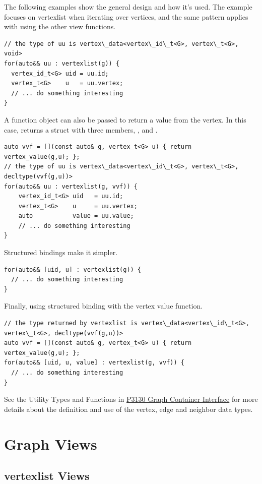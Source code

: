 The following examples show the general design and how it's used. The example focuses 
on vertexlist when iterating over vertices, and the same pattern applies with using the other
view functions.

\begin{lstlisting}
// the type of uu is vertex\_data<vertex\_id\_t<G>, vertex\_t<G>, void>
for(auto&& uu : vertexlist(g)) {
  vertex_id_t<G> uid = uu.id;
  vertex_t<G>    u   = uu.vertex;
  // ... do something interesting
}
\end{lstlisting}

A function object can also be passed to return a value from the vertex. In this case,  returns 
a struct with three members, ,  and .
\begin{lstlisting}
auto vvf = [](const auto& g, vertex_t<G> u) { return vertex_value(g,u); };
// the type of uu is vertex\_data<vertex\_id\_t<G>, vertex\_t<G>, decltype(vvf(g,u))>
for(auto&& uu : vertexlist(g, vvf)) {
    vertex_id_t<G> uid   = uu.id;
    vertex_t<G>    u     = uu.vertex;
    auto           value = uu.value;
    // ... do something interesting
}
\end{lstlisting}
    
Structured bindings make it simpler.
\begin{lstlisting}
for(auto&& [uid, u] : vertexlist(g)) {
  // ... do something interesting
}
\end{lstlisting}

Finally, using structured binding with the vertex value function.
\begin{lstlisting}
// the type returned by vertexlist is vertex\_data<vertex\_id\_t<G>, vertex\_t<G>, decltype(vvf(g,u))>
auto vvf = [](const auto& g, vertex_t<G> u) { return vertex_value(g,u); };
for(auto&& [uid, u, value] : vertexlist(g, vvf)) {
  // ... do something interesting
}
\end{lstlisting}

See the Utility Types and Functions in \href{https://www.wg21.link/P3130}{P3130 Graph Container Interface}
for more details about the definition and use of the vertex, edge and neighbor data types.


\section{Graph Views}

\subsection{vertexlist Views}

